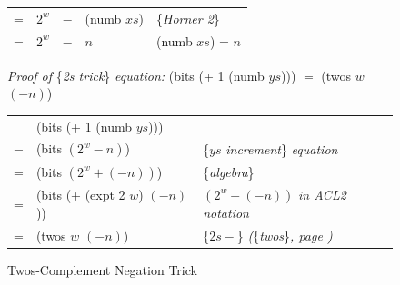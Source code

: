 \begin{figure}
\begin{center}
\begin{tabular} {lllll}
= & $2^w$ &$- $ &(numb $xs$)                                                   & \{\emph{Horner 2}\}   \\
= & $2^w$ &$- $ &$n$                                                           & (numb $xs$) = $n$     \\
\end{tabular}
\end{center}
\emph{Proof of} \{\emph{2s trick}\} \emph{equation:} (bits (+ 1 (numb $ys$))) $=$ (twos $w$ $(- n)$)
\begin{center}
\begin{tabular} {lll}
  & (bits (+ 1 (numb $ys$)))        & \\
= & (bits $(2^w - n)$)              & \{$ys$ \emph{increment}\} \emph{equation} \\
= & (bits $(2^w + (- n))$)          & \{\emph{algebra}\}                        \\
= & (bits (+ (expt 2 $w$) $(- n)$)) & $(2^w + (- n))$ \emph{in ACL2 notation}   \\
= & (twos $w$ $(- n)$)              & \{$2s-$\} \emph{(}\{\emph{twos}\}\emph{, page \pageref{twos-defun})} \\
\end{tabular}
\end{center}
\caption{Twos-Complement Negation Trick}
\label{fig:2s-comp-negation}
\end{figure}

